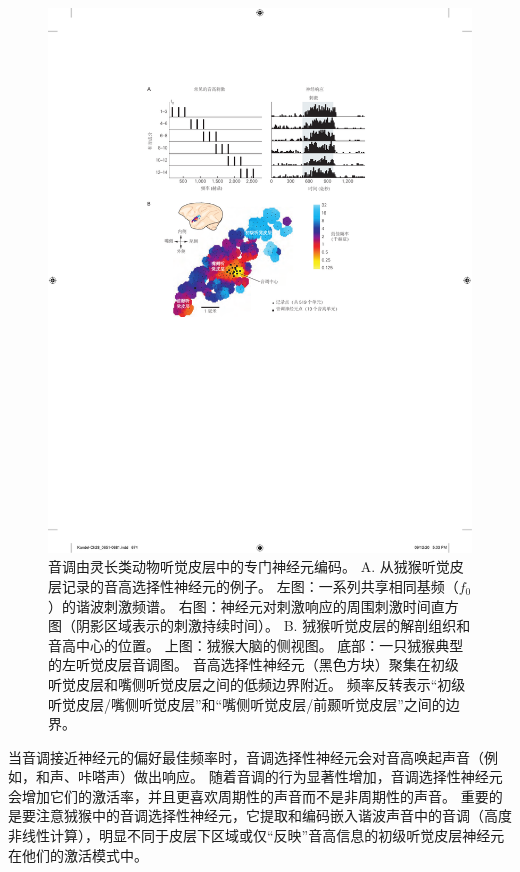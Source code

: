 \begin{figure}[htbp]
	\centering
	\includegraphics[width=0.85\linewidth]{chap28/fig_28_13}
	\caption{音调由灵长类动物听觉皮层中的专门神经元编码。
		A. 从狨猴听觉皮层记录的音高选择性神经元的例子。
		左图：一系列共享相同基频（$f_0$）的谐波刺激频谱。
		右图：神经元对刺激响应的周围刺激时间直方图（阴影区域表示的刺激持续时间）\cite{bendor2005neuronal}。
		B. 狨猴听觉皮层的解剖组织和音高中心的位置。
		上图：狨猴大脑的侧视图。
		底部：一只狨猴典型的左听觉皮层音调图。
		音高选择性神经元（黑色方块）聚集在初级听觉皮层和嘴侧听觉皮层之间的低频边界附近。
		频率反转表示“初级听觉皮层/嘴侧听觉皮层”和“嘴侧听觉皮层/前颞听觉皮层”之间的边界\cite{bendor2005neuronal}。}
	\label{fig:28_13}
\end{figure}


当音调接近神经元的偏好最佳频率时，音调选择性神经元会对音高唤起声音（例如，和声、咔嗒声）做出响应。
随着音调的行为显著性增加，音调选择性神经元会增加它们的激活率，并且更喜欢周期性的声音而不是非周期性的声音。
重要的是要注意狨猴中的音调选择性神经元，它提取和编码嵌入谐波声音中的音调（高度非线性计算），明显不同于皮层下区域或仅“反映”音高信息的初级听觉皮层神经元在他们的激活模式中。


